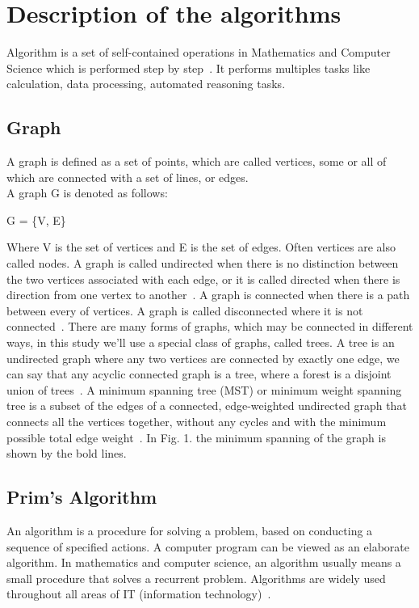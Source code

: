 \documentclass[conference,column]{IEEEtran}
\begin{document}
\section{Description of the algorithms}
Algorithm is a set of self-contained operations in Mathematics and Computer Science which is performed step by step~\cite{algo}. It performs multiples tasks like calculation, data processing, automated reasoning tasks.

\subsection{Graph}
A graph is defined as a set of points, which are called vertices, some or all of which are connected with a set of lines, or edges.\\A graph G is denoted as follows:

G = \{V, E\}

Where V is the set of vertices and E is the set of edges. Often vertices are also called nodes. A graph is called undirected when there is no distinction between the two vertices associated with each edge, or it is called directed  when there is direction from one vertex to another~\cite{graphtheory}. A graph is connected when there is a path between every of vertices. A graph is called disconnected where it is not connected~\cite{connectedgraph}. There are many forms of graphs, which may be connected in different ways, in this study we’ll use a special class of graphs, called trees. A tree is an undirected graph where any two vertices are connected by exactly one edge, we can say that any acyclic connected graph is a tree, where a forest is a disjoint union of trees~\cite{tree}. A minimum spanning tree (MST) or minimum weight spanning tree is a subset of the edges of a connected, edge-weighted undirected graph that connects all the vertices together, without any cycles and with the minimum possible total edge weight~\cite{minimum}. In Fig. 1. the minimum spanning of the graph is shown by the bold lines.


\subsection{Prim's Algorithm}
An algorithm is a procedure  for solving a problem, based on conducting a sequence of specified actions. A computer program can be viewed as an elaborate algorithm. In mathematics and computer science, an algorithm usually means a small procedure that solves a recurrent problem. Algorithms are widely used throughout all areas of IT (information technology)~\cite{quo}.
\end{document}
